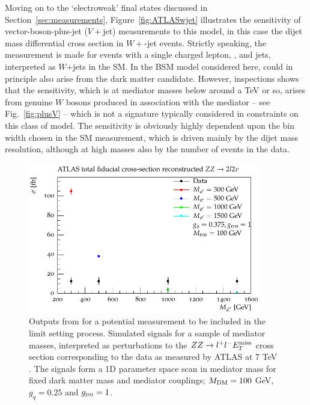 \documentclass[floatfix]{article}
\begin{document}
Moving on to the `electroweak' final states discussed in Section~\ref{sec:measurements}, Figure~\ref{fig:ATLASwjet} illustrates the sensitivity of vector-boson-plus-jet
($V+$jet) measurements to this model, in this case the dijet mass differential cross section in $W+$-jet events. Strictly speaking, the measurement is made for
events with a single charged lepton, \MET, and jets, interpreted as $W$+jets in the SM. In the BSM model considered here, \MET could in principle 
also arise from the dark matter candidate. However, inspections shows that the sensitivity, which is at mediator masses below around a TeV or so, arises 
from genuine $W$ bosons produced in association with the mediator -- see Fig.~\ref{fig:plusV} -- which is not a signature typically considered in 
constraints on this class of model. The sensitivity
is obviously highly dependent upon the bin width chosen in the SM measurement, which is driven mainly by the dijet mass resolution, although at high masses also by
the number of events in the data.

\begin{figure}
\centering
      \includegraphics[width=0.9\textwidth]{images/atlaszz/fullrange/ATLASZZ.pdf}
\caption{Outputs from \rivet for a potential measurement to be included in the limit setting process. Simulated signals for a 
sample of mediator masses, interpreted as perturbations to the $ZZ\rightarrow l^+l^- E_T^{\rm miss}$ cross section 
corresponding to the data as measured by ATLAS at 7 TeV~\cite{Aad:2012awa} \label{fig:ATLASzz}. The signals form a 1D parameter space scan in 
mediator mass \MZP for fixed dark matter mass and mediator couplings; $M_{\rm DM}=100$ GeV, $g_{q}=0.25$ and $g_{\textsc{dm}} = 1$.}
\label{fig:ATLASzz}
\end{figure}
\end{document}
